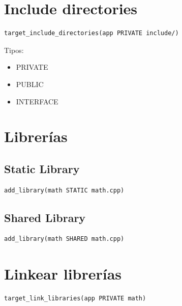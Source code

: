 \documentclass[a4paper,11pt]{article}
\begin{document}

\section*{Include directories}

\begin{lstlisting}
target_include_directories(app PRIVATE include/)
\end{lstlisting}

Tipos:
\begin{itemize}
    \item PRIVATE
    \item PUBLIC
    \item INTERFACE
\end{itemize}


\section*{Librerías}

\subsection*{Static Library}

\begin{lstlisting}
add_library(math STATIC math.cpp)
\end{lstlisting}

\subsection*{Shared Library}

\begin{lstlisting}
add_library(math SHARED math.cpp)
\end{lstlisting}


\section*{Linkear librerías}

\begin{lstlisting}
target_link_libraries(app PRIVATE math)
\end{lstlisting}

\end{document}
